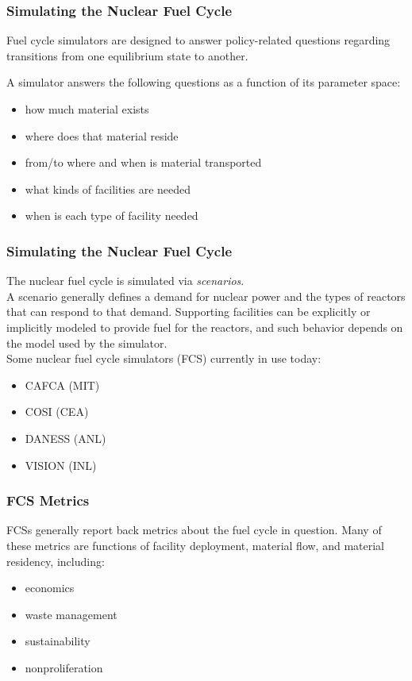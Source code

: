 
\begin{frame}[ctb!]
  \frametitle{Simulating the Nuclear Fuel Cycle} 

  Fuel cycle simulators are designed to answer policy-related questions
  regarding transitions from one equilibrium state to another.

  \vspace{0.2cm}

  \pause
  A simulator answers the following questions as a function of its 
  parameter space:
  \begin{itemize}
    \item how much material exists
    \item where does that material reside
    \item from/to where and when is material transported
    \item what kinds of facilities are needed
    \item when is each type of facility needed
  \end{itemize}
\end{frame}

\begin{frame}[ctb!]
  \frametitle{Simulating the Nuclear Fuel Cycle}
  The nuclear fuel cycle is simulated via \textit{scenarios}.\\

  A scenario generally defines a demand for nuclear power and the types of
  reactors that can respond to that demand. Supporting facilities can be
  explicitly or implicitly modeled to provide fuel for the reactors, and such
  behavior depends on the model used by the simulator.\\

  Some nuclear fuel cycle simulators (FCS) currently in use today:
  \begin{itemize}
    \item CAFCA (MIT) \cite{busquim_e_silva_system_2008}
    \item COSI (CEA) \cite{boucher_cosi:_2006}
    \item DANESS (ANL) \cite{durpel_daness_2003}
    \item VISION (INL) \cite{yacout_vision_2006}
  \end{itemize}
\end{frame}

\begin{frame}[ctb!]
  \frametitle{FCS Metrics}

  FCSs generally report back metrics about the fuel cycle in question. Many of
  these metrics are functions of facility deployment, material flow, and
  material residency, including:

  \begin{itemize}
    \item economics
    \item waste management
    \item sustainability
    \item nonproliferation
  \end{itemize}
\end{frame}

